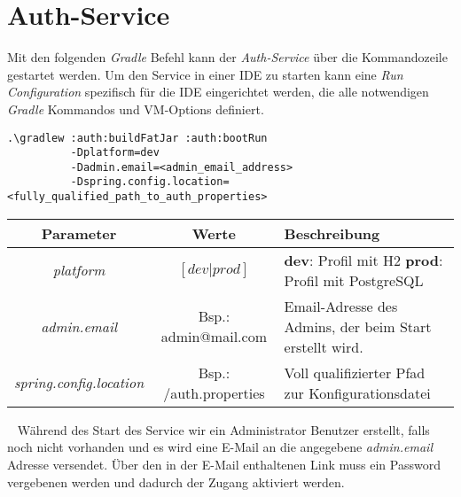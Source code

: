 \documentclass[]{article}
\begin{document}
{\section{Auth-Service}
Mit den folgenden \emph{Gradle} Befehl kann der \emph{Auth-Service} über die Kommandozeile gestartet werden. Um den Service in einer IDE zu starten kann eine \emph{Run Configuration} spezifisch für die IDE eingerichtet werden, die alle notwendigen \emph{Gradle} Kommandos und VM-Options definiert.
\begin{verbatim}
.\gradlew :auth:buildFatJar :auth:bootRun
          -Dplatform=dev
          -Dadmin.email=<admin_email_address>                
          -Dspring.config.location=<fully_qualified_path_to_auth_properties>
\end{verbatim}
{\renewcommand{\arraystretch}{2}%
\begin{center}
	\begin{tabular}{| c | c | p{8.3cm} |}
		\hline
		\textbf{Parameter} & \textbf{Werte} & \textbf{Beschreibung}  \\ \hline
		\textit{platform} & $[dev|prod]$ & \textbf{dev}: Profil mit H2 \newline
		\textbf{prod}: Profil mit PostgreSQL
		\\ \hline
		\textit{admin.email} & Bsp.: admin@mail.com & Email-Adresse des Admins, der beim Start erstellt wird. \\ \hline
		\textit{spring.config.location} & Bsp.: /auth.properties & Voll qualifizierter Pfad zur Konfigurationsdatei  \\ \hline
	\end{tabular}
\end{center}
\ \newline
Während des Start des Service wir ein Administrator Benutzer erstellt, falls noch nicht vorhanden und es wird eine E-Mail an die angegebene \emph{admin.email} Adresse versendet. Über den in der E-Mail enthaltenen Link muss ein Password vergebenen werden und dadurch der Zugang aktiviert werden.
}}
\end{document}
